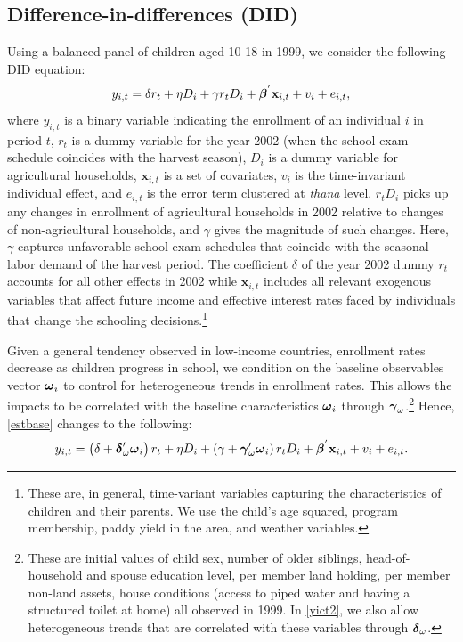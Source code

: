 \documentclass[12pt,letterpaper]{article}
\newcommand{\bfbeta}{\ensuremath{\mbox{\boldmath $\beta$}}}
\newcommand{\bfgamma}{\ensuremath{\mbox{\boldmath $\gamma$}}}
\newcommand{\bfdelta}{\ensuremath{\mbox{\boldmath $\delta$}}}
\newcommand{\bfomega}{\ensuremath{\mbox{\boldmath $\omega$}}}
\newcommand{\0}{\ensuremath{\mbox{\boldmath $0$}}}
\begin{document}
\subsection{Difference-in-differences (DID)}

Using a balanced panel of children aged 10-18 in 1999, we consider the following DID equation:
\begin{equation}
y_{i,t} = \delta r_{t} + \eta D_{i} + \gamma r_{t}D_{i} + \bfbeta^{'} \textbf{x}_{i,t} + v_{i} + e_{i,t},
\label{estbase}
\end{equation}
where $y_{i,t}$ is a binary variable indicating the enrollment of an individual $i$ in period $t$, $r_{t}$ is a dummy variable for the year 2002 (when the school exam schedule coincides with the harvest season), $D_{i}$ is a dummy variable for agricultural households, $\textbf{x}_{i,t}$ is a set of covariates,  $v_{i}$ is the time-invariant individual effect, and $e_{i,t}$ is the error term clustered at \textit{thana} level. $r_{t}D_{i}$ picks up any changes in enrollment of agricultural households in 2002 relative to changes of non-agricultural households, and $\gamma$ gives the magnitude of such changes. Here, $\gamma$ captures unfavorable school exam schedules that coincide with the seasonal labor demand of the harvest period. The coefficient $\delta$ of the year 2002 dummy $r_{t}$ accounts for all other effects in 2002 while $\textbf{x}_{i,t}$ includes all relevant exogenous variables that affect future income and effective interest rates faced by individuals that change the schooling decisions.\footnote{These are, in general, time-variant variables capturing the characteristics of children and their parents. We use the child's age squared, program membership, paddy yield in the area, and weather variables. }

Given a general tendency observed in low-income countries, enrollment rates decrease as children progress in school, we condition on the baseline observables vector $\bfomega_{i}$ to control for heterogeneous trends in enrollment rates. This allows the impacts to be correlated with the baseline characteristics $\bfomega_{i}$ through $\bfgamma_{\omega}$.\footnote{These are initial values of child sex, number of older siblings, head-of-household and spouse education level, per member land holding, per member non-land assets, house conditions (access to piped water and having a structured toilet at home) all observed in 1999. In \eqref{yict2}, we also allow heterogeneous trends that are correlated with these variables through $\bfdelta_{\omega}$. }
Hence, \eqref{estbase} changes to the following:
\begin{equation}
y_{i,t} = 
\left(\delta +\bfdelta'_{\omega}\bfomega_{i}\right)r_{t} + \eta D_{i} +
\left(\gamma + \bfgamma'_{\omega}\bfomega_{i}\right)r_{t}D_{i} + 
\bfbeta^{'}\textbf{x}_{i,t} + v_{i} + e_{i,t}.
\label{yict2}
\end{equation}
\end{document}
